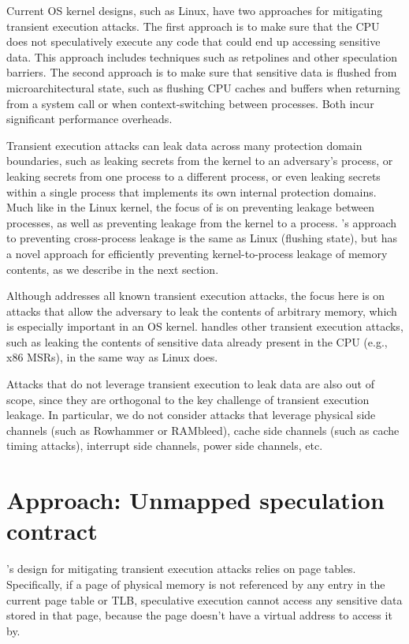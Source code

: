 Current OS kernel designs, such as Linux, have two approaches for
mitigating transient execution attacks.  The first approach is to make
sure that the CPU does not speculatively execute any code that could
end up accessing sensitive data.  This approach includes techniques such
as retpolines and other speculation barriers.  The second approach is to
make sure that sensitive data is flushed from microarchitectural state,
such as flushing CPU caches and buffers when returning from a system
call or when context-switching between processes.  Both incur significant
performance overheads.

Transient execution attacks can leak data across many protection domain
boundaries, such as leaking secrets from the kernel to an adversary's
process, or leaking secrets from one process to a different process,
or even leaking secrets within a single process that implements its
own internal protection domains.  Much like in the Linux kernel, the
focus of \sys is on preventing leakage between processes, as well as
preventing leakage from the kernel to a process.  \sys's approach to
preventing cross-process leakage is the same as Linux (flushing state),
but \sys has a novel approach for efficiently preventing kernel-to-process
leakage of memory contents, as we describe in the next section.

Although \sys addresses all known transient execution attacks, the focus
here is on attacks that allow the adversary to leak the contents
of arbitrary memory, which is especially important in an OS kernel.
\sys handles other transient execution attacks, such as leaking the
contents of sensitive data already present in the CPU (e.g., x86 MSRs),
in the same way as Linux does.

Attacks that do not leverage transient execution to leak data are also
out of scope, since they are orthogonal to the key
challenge of transient execution leakage.  In particular, we do not
consider attacks that leverage physical side channels (such
as Rowhammer or RAMbleed), cache side channels (such as cache timing
attacks), interrupt side channels, power side channels, etc.

\section{Approach: Unmapped speculation contract}
\label{s:ward-approach}

\sys's design for mitigating transient execution attacks relies
on page tables.  Specifically, if a page of physical
memory is not referenced by any entry in the current page table or
TLB, speculative execution cannot access any sensitive data stored in
that page, because the page doesn't have a virtual address to access
it by.

